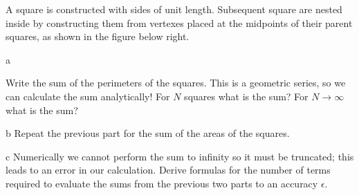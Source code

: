 \documentclass[]{homework}
\begin{document}
\begin{problem}{1}
  A square is constructed with sides of unit length. Subsequent square are nested 
  inside by constructing them
  from vertexes placed at the midpoints of their parent squares, as shown in the figure below right.

  \begin{subproblem}{a}
    \begin{minipage}[t]{\linewidth}
      \begin{wrapfigure}{r}{3cm}
        \vspace{-1em}
      \end{wrapfigure}
      \vspace{-0.7  em}
      Write the sum of the perimeters of the squares.
      This is a geometric series, so we can calculate the sum analytically!
      For $N$ squares what is the sum?
      For $N\rightarrow\infty$ what is the sum?
    \end{minipage}
  \end{subproblem}
  \begin{subproblem}{b}
    Repeat the previous part for the sum of the areas of the squares.
  \end{subproblem}
  \begin{subproblem}{c}
    Numerically we cannot perform the sum to infinity so it must be truncated; this leads to an error in our calculation.
    Derive formulas for the number of terms required to evaluate the sums from the previous two parts to an accuracy $\epsilon$.\\

\end{subproblem}
\end{problem}
\end{document}
